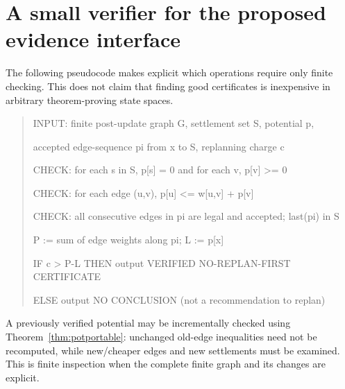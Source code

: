 \documentclass[11pt]{article}
\theoremstyle{definition}\newtheorem{definition}[theorem]{Definition}\newtheorem{assumption}[theorem]{Assumption}
\theoremstyle{remark}\newtheorem{remark}[theorem]{Remark}
\begin{document}
\section{A small verifier for the proposed evidence interface}
\label{app:verifier}
The following pseudocode makes explicit which operations require only finite checking. This does not claim that finding good certificates is inexpensive in arbitrary theorem-proving state spaces.
\begin{quote}\ttfamily\small
INPUT: finite post-update graph G, settlement set S, potential p,\par
\hspace*{1em} accepted edge-sequence pi from x to S, replanning charge c\par
CHECK: for each s in S, p[s] = 0 and for each v, p[v] >= 0\par
CHECK: for each edge (u,v), p[u] <= w[u,v] + p[v]\par
CHECK: all consecutive edges in pi are legal and accepted; last(pi) in S\par
P := sum of edge weights along pi; L := p[x]\par
IF c > P-L THEN output VERIFIED NO-REPLAN-FIRST CERTIFICATE\par
ELSE output NO CONCLUSION (not a recommendation to replan)\par
\end{quote}
A previously verified potential may be incrementally checked using Theorem~\ref{thm:potportable}: unchanged old-edge inequalities need not be recomputed, while new/cheaper edges and new settlements must be examined. This is finite inspection when the complete finite graph and its changes are explicit.
\end{document}
